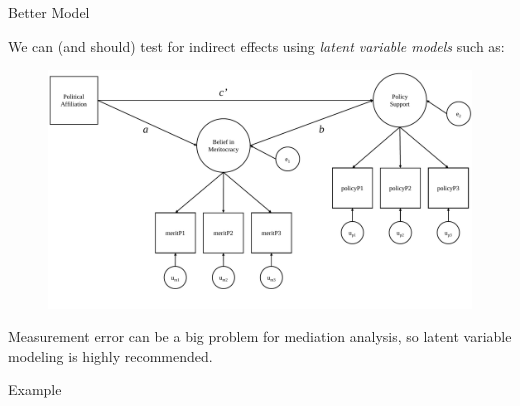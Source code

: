\documentclass{beamer}
\begin{document}
\begin{frame}{Better Model}

  We can (and should) test for indirect effects using \emph{latent
    variable models} such as:
  \begin{figure}
    \includegraphics[width=.8\textwidth]{figures/semMedDiagram.pdf}
  \end{figure}
  Measurement error can be a big problem for mediation analysis, so
  latent variable modeling is highly recommended.

\end{frame}



\begin{frame}[allowframebreaks]{Example}
  


\pagebreak



\end{frame}
\end{document}
